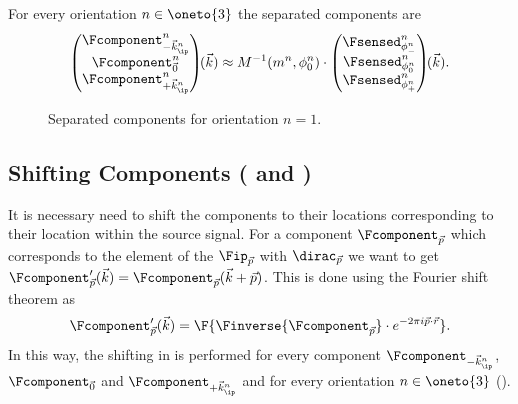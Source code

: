 For every orientation \(n \in \oneto{3}\) the separated components are
    \begin{equation*}
        \begin{pmatrix}
        \Fcomponent^{n}_{-\vec{k}^{n}_\ip} \\
        \Fcomponent^{n}_{\vec{0}} \\
        \Fcomponent^{n}_{+\vec{k}^{n}_\ip} \\
    \end{pmatrix}\hspace{-0.3em}(\vec{k}) 
        \approx M^{-1}(m^{n}, \phi^{n}_0) \cdot \begin{pmatrix}
            \Fsensed^{n}_{\phi^{n}_{-}} \\ \Fsensed^{n}_{\phi^{n}_0} \\ \Fsensed^{n}_{\phi^{n}_{+}}
        \end{pmatrix}\hspace{-0.3em}(\vec{k}).
    \end{equation*}

\begin{figure}
    \caption{Separated components for orientation \(n=1\).}
\end{figure}

\subsection{Shifting Components ( and )}

It is necessary need to shift the components to their locations corresponding to their location within the
    source signal.
For a component \(\Fcomponent_{\vec{p}}\) which corresponds to the element of the \(\Fip_{\vec{p}}\) with 
    \(\dirac_{\vec{p}}\) we want to get \(\Fcomponent_{\vec{p}}'(\vec{k}) = \Fcomponent_{\vec{p}}(\vec{k} + \vec{p})\).
This is done using the Fourier shift theorem as
    \begin{equation*}
        \Fcomponent'_{\vec{p}}(\vec{k}) = \F{\Finverse{\Fcomponent_{\vec{p}}} \cdot e^{-2\pi i  \vec{p} \cdot \vec{r}}}.
    \end{equation*}
In this way, the shifting in  is performed for every component \(\Fcomponent_{-\vec{k}^{n}_\ip}\),
    \(\Fcomponent_{\vec{0}}\) and \(\Fcomponent_{+\vec{k}^{n}_\ip}\) and for every orientation \(n \in \oneto{3}\)
    ().


